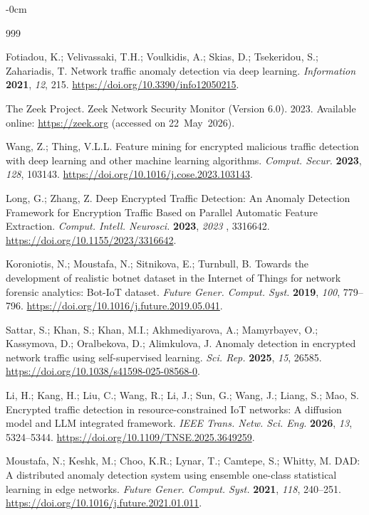 \documentclass[futureinternet,article,accept,moreauthors]{Definitions/mdpi}
\begin{document}
\begin{adjustwidth}{-\extralength}{0cm}
\begin{thebibliography}{999}
  
  Fotiadou, K.; Velivassaki, T.H.; Voulkidis, A.; Skias, D.; Tsekeridou, S.; Zahariadis, T. Network traffic anomaly detection via deep learning. \emph{Information} \textbf{2021}, \emph{12}, 215. \url{https://doi.org/10.3390/info12050215}.

  
  The Zeek Project. Zeek Network Security Monitor (Version 6.0). 2023. Available online: \url{https://zeek.org} (accessed on \mbox{22 May 2026}).

  
  Wang, Z.; Thing, V.L.L. Feature mining for encrypted malicious traffic detection with deep learning and other machine learning algorithms. \emph{Comput. Secur.} \textbf{2023}, \emph{128}, 103143. \url{https://doi.org/10.1016/j.cose.2023.103143}.

  
  Long, G.; Zhang, Z. Deep Encrypted Traffic Detection: An Anomaly Detection Framework for Encryption Traffic Based on Parallel Automatic Feature Extraction. \emph{Comput. Intell. Neurosci.} \textbf{2023}, \emph{2023 }, 3316642. \url{https://doi.org/10.1155/2023/3316642}.

  
  Koroniotis, N.; Moustafa, N.; Sitnikova, E.; Turnbull, B. Towards the development of realistic botnet dataset in the Internet of Things for network forensic analytics: Bot-IoT dataset. \emph{Future Gener. Comput. Syst.} \textbf{2019}, \emph{100}, 779--796. \url{https://doi.org/10.1016/j.future.2019.05.041}.

  
  Sattar, S.; Khan, S.; Khan, M.I.; Akhmediyarova, A.; Mamyrbayev, O.; Kassymova, D.; Oralbekova, D.; Alimkulova, J. Anomaly detection in encrypted network traffic using self-supervised learning. \emph{Sci. Rep.} \textbf{2025}, \emph{15}, 26585. \url{https://doi.org/10.1038/s41598-025-08568-0}.
\clearpage 
  
  Li, H.; Kang, H.; Liu, C.; Wang, R.; Li, J.; Sun, G.; Wang, J.; Liang, S.; Mao, S. Encrypted traffic detection in resource-constrained IoT networks: A diffusion model and LLM integrated framework. \emph{IEEE Trans. Netw. Sci. Eng.} \textbf{2026}, \emph{13}, 5324--5344. \url{https://doi.org/10.1109/TNSE.2025.3649259}.

  
  Moustafa, N.; Keshk, M.; Choo, K.R.; Lynar, T.; Camtepe, S.; Whitty, M. DAD: A distributed anomaly detection system using ensemble one-class statistical learning in edge networks. \emph{Future Gener. Comput. Syst.} \textbf{2021}, \emph{118}, 240--251. \url{https://doi.org/10.1016/j.future.2021.01.011}.
  
  \end{thebibliography}
  

\PublishersNote{}
\end{adjustwidth}
\end{document}
